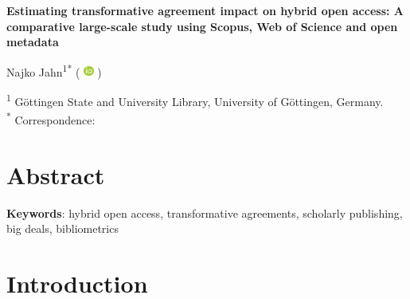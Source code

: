 \documentclass[a4paper,man,floatsintext,longtable,noextraspace,10pt]{apa6}
\begin{document}
\thispagestyle{otherpage}


\begin{large}
\textbf{Estimating transformative agreement impact on hybrid open access: A comparative large-scale study using Scopus, Web of Science and open metadata}
\end{large}

\newcommand{\orcid}{%
  \begingroup\normalfont
  \includegraphics[height=0.9em]{orcid_logo}%
  \endgroup
}

Najko Jahn\textsuperscript{1}\textsuperscript{*} 
(\orcid{} \href{https://orcid.org/0000-0001-5105-1463}{\color{black}{0000-0001-5105-1463}})

\textsuperscript{1} Göttingen State and University Library, University of Göttingen, Germany. \\

\textsuperscript{*} Correspondence: \href{mailto:najko.jahn@sub.uni-goettingen.de}{\color{black}{najko.jahn@sub.uni-goettingen.de}} 

\section*{Abstract}
{}
{\textbf{Keywords}: hybrid open access, transformative agreements, scholarly publishing, big deals, bibliometrics}

\newpage

\setcounter{secnumdepth}{2}

\section{Introduction}\label{introduction}
\end{document}
